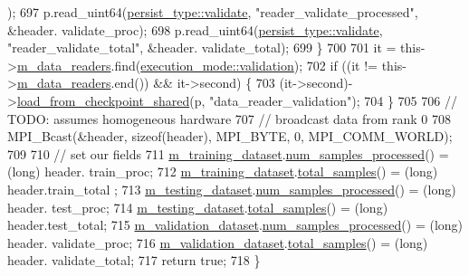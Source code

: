 \begin{DoxyCode}
      );
697       p.read\_uint64(\hyperlink{namespacelbann_adee41f31f15f3906cbdcce4a1417eb56af9ab05454998236921a6b0e281fae632}{persist\_type::validate}, \textcolor{stringliteral}{"reader\_validate\_processed"}, &header.
      validate\_proc);
698       p.read\_uint64(\hyperlink{namespacelbann_adee41f31f15f3906cbdcce4a1417eb56af9ab05454998236921a6b0e281fae632}{persist\_type::validate}, \textcolor{stringliteral}{"reader\_validate\_total"},     &header.
      validate\_total);
699     \}
700 
701     it = this->\hyperlink{classlbann_1_1generic__input__layer_a6bc18860c02beed0252ea3cc87bc48d2}{m\_data\_readers}.find(\hyperlink{base_8hpp_a2781a159088df64ed7d47cc91c4dc0a8aa617908b172c473cb8e8cda059e55bf0}{execution\_mode::validation});
702     \textcolor{keywordflow}{if} ((it != this->\hyperlink{classlbann_1_1generic__input__layer_a6bc18860c02beed0252ea3cc87bc48d2}{m\_data\_readers}.end()) && it->second) \{
703       (it->second)->\hyperlink{classlbann_1_1generic__input__layer_ae5a542333eaf447a05fc586848e7c94c}{load\_from\_checkpoint\_shared}(p, \textcolor{stringliteral}{"data\_reader\_validation"});
704     \}
705 
706     \textcolor{comment}{// TODO: assumes homogeneous hardware}
707     \textcolor{comment}{// broadcast data from rank 0}
708     MPI\_Bcast(&header, \textcolor{keyword}{sizeof}(header), MPI\_BYTE, 0, MPI\_COMM\_WORLD);
709 
710     \textcolor{comment}{// set our fields}
711     \hyperlink{classlbann_1_1generic__input__layer_a23716635b1062bfe57f7fcf75140a63a}{m\_training\_dataset}.\hyperlink{classlbann_1_1dataset_a412b29a50638f7d8feea4ad368c6a4dc}{num\_samples\_processed}()   = (long) header.
      train\_proc;
712     \hyperlink{classlbann_1_1generic__input__layer_a23716635b1062bfe57f7fcf75140a63a}{m\_training\_dataset}.\hyperlink{classlbann_1_1dataset_ab951c879f151990613567e985fe1e278}{total\_samples}()           = (long) header.train\_total
      ;
713     \hyperlink{classlbann_1_1generic__input__layer_a66b9ec6b393695232bd98edc62fc1348}{m\_testing\_dataset}.\hyperlink{classlbann_1_1dataset_a412b29a50638f7d8feea4ad368c6a4dc}{num\_samples\_processed}()    = (long) header.
      test\_proc;
714     \hyperlink{classlbann_1_1generic__input__layer_a66b9ec6b393695232bd98edc62fc1348}{m\_testing\_dataset}.\hyperlink{classlbann_1_1dataset_ab951c879f151990613567e985fe1e278}{total\_samples}()            = (long) header.test\_total;
715     \hyperlink{classlbann_1_1generic__input__layer_abd70adf607d1cef87fb6641af77e816d}{m\_validation\_dataset}.\hyperlink{classlbann_1_1dataset_a412b29a50638f7d8feea4ad368c6a4dc}{num\_samples\_processed}() = (long) header.
      validate\_proc;
716     \hyperlink{classlbann_1_1generic__input__layer_abd70adf607d1cef87fb6641af77e816d}{m\_validation\_dataset}.\hyperlink{classlbann_1_1dataset_ab951c879f151990613567e985fe1e278}{total\_samples}()         = (long) header.
      validate\_total;
717     \textcolor{keywordflow}{return} \textcolor{keyword}{true};
718   \}
\end{DoxyCode}
